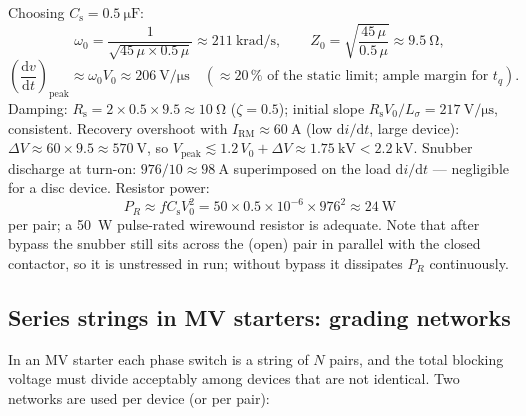 Choosing $C_\mathrm{s} = \SI{0.5}{\micro\farad}$:
\begin{equation}
  \omega_0 = \frac{1}{\sqrt{45\,\mu \times 0.5\,\mu}}
  \approx \SI{211}{\kilo\radian\per\second}, \qquad
  Z_0 = \sqrt{\frac{45\,\mu}{0.5\,\mu}} \approx \SI{9.5}{\ohm},
\end{equation}
\begin{equation}
  \left(\frac{\mathrm{d}v}{\mathrm{d}t}\right)_\mathrm{peak}
  \approx \omega_0 V_0 \approx \SI{206}{\volt\per\micro\second}
  \quad (\approx 20\,\% \text{ of the static limit; ample margin for } t_q).
\end{equation}
Damping: $R_\mathrm{s} = 2 \times 0.5 \times 9.5 \approx \SI{10}{\ohm}$
($\zeta = 0.5$); initial slope $R_\mathrm{s}V_0/L_\sigma =
\SI{217}{\volt\per\micro\second}$, consistent. Recovery overshoot with
$I_\mathrm{RM} \approx \SI{60}{\ampere}$ (low
$\mathrm{d}i/\mathrm{d}t$, large device):
$\Delta V \approx 60 \times 9.5 \approx \SI{570}{\volt}$, so
$V_\mathrm{peak} \lesssim 1.2\,V_0 + \Delta V \approx \SI{1.75}{\kilo\volt}
< \SI{2.2}{\kilo\volt}$. Snubber discharge at turn-on:
$976/10 \approx \SI{98}{\ampere}$ superimposed on the load
$\mathrm{d}i/\mathrm{d}t$ --- negligible for a disc device. Resistor power:
\begin{equation}
  P_R \approx f C_\mathrm{s} V_0^2
  = 50 \times 0.5\times10^{-6} \times 976^2 \approx \SI{24}{\watt}
\end{equation}
per pair; a \SI{50}{\watt} pulse-rated wirewound resistor is adequate. Note
that after bypass the snubber still sits across the (open) pair in parallel
with the closed contactor, so it is unstressed in run; without bypass it
dissipates $P_R$ continuously.

\subsection{Series strings in MV starters: grading networks}

In an MV starter each phase switch is a string of $N$ pairs, and the total
blocking voltage must divide acceptably among devices that are not
identical. Two networks are used per device (or per pair):

